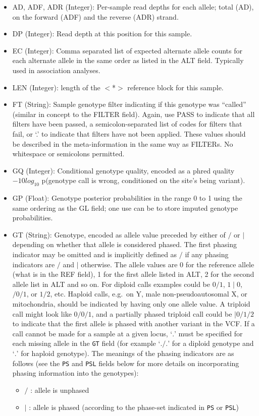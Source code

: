 \documentclass[8pt]{article}
\begin{document}
\begin{itemize}
\renewcommand{\labelitemii}{$\circ$}
  \item AD, ADF, ADR (Integer): Per-sample read depths for each allele; total (AD), on the forward (ADF) and the reverse (ADR) strand.
  \item DP (Integer): Read depth at this position for this sample.
  \item EC (Integer): Comma separated list of expected alternate allele counts for each alternate allele in the same order as listed in the ALT field.
  Typically used in association analyses.
  \item LEN (Integer): length of the $<$*$>$ reference block for this sample.
  \item FT (String): Sample genotype filter indicating if this genotype was ``called'' (similar in concept to the FILTER field).
  Again, use PASS to indicate that all filters have been passed, a semicolon-separated list of codes for filters that fail, or `.' to indicate that filters have not been applied.
  These values should be described in the meta-information in the same way as FILTERs.
  No whitespace or semicolons permitted.
  \item GQ (Integer): Conditional genotype quality, encoded as a phred quality $-10log_{10}$ p(genotype call is wrong, conditioned on the site's being variant).
  \item GP (Float): Genotype posterior probabilities in the range 0 to 1 using the same ordering as the GL field; one use can be to store imputed genotype probabilities.
  \item GT (String): Genotype, encoded as allele value preceded by either of $/$ or $\mid$ depending on whether that allele is considered phased.
    The first phasing indicator may be omitted and is implicitly defined as $/$ if any phasing indicators are $/$ and $\mid$ otherwise.
    The allele values are 0 for the reference allele (what is in the REF field), 1 for the first allele listed in ALT, 2 for the second allele list in ALT and so on.
    For diploid calls examples could be $0/1$, $1\mid0$, $/0/1$, or $1/2$, etc.
    Haploid calls, e.g.\ on Y, male non-pseudoautosomal X, or mitochondria, should be indicated by having only one allele value.
    A triploid call might look like $0/0/1$, and a partially phased triploid call could be $|0/1/2$ to indicate that the first allele is phased with another variant in the VCF.
    If a call cannot be made for a sample at a given locus, `$.$' must be specified for each missing allele in the {\tt GT} field (for example `$./.$' for a diploid genotype and `$.$' for haploid genotype).
    The meanings of the phasing indicators are as follows (see the {\tt PS} and {\tt PSL} fields below for more details on incorporating phasing information into the genotypes):
    \begin{itemize}
      \item $/$ : allele is unphased
      \item $\mid$ : allele is phased (according to the phase-set indicated in {\tt PS} or {\tt PSL})
    \end{itemize}


\end{itemize}
\end{document}
